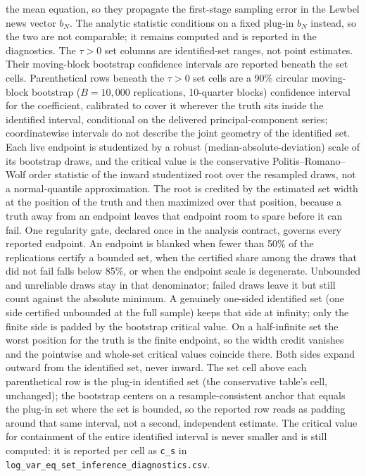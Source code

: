 \begin{table}[!htbp]
\begin{threeparttable}
\begin{tablenotes}[flushleft]
the mean equation, so they propagate the first-stage sampling error in the Lewbel news vector $b_N$. The analytic statistic conditions on a fixed plug-in $b_N$ instead, so the two are not comparable; it remains computed and is reported in the diagnostics. The $\tau{>}0$ set columns are identified-set ranges, not point estimates. Their moving-block bootstrap confidence intervals are reported beneath the set cells. Parenthetical rows beneath the $\tau{>}0$ set cells are a 90\% circular moving-block bootstrap ($B=10{,}000$ replications, 10-quarter blocks) confidence interval for the coefficient, calibrated to cover it wherever the truth sits inside the identified interval, conditional on the delivered principal-component series; coordinatewise intervals do not describe the joint geometry of the identified set. Each live endpoint is studentized by a robust (median-absolute-deviation) scale of its bootstrap draws, and the critical value is the conservative Politis--Romano--Wolf order statistic of the inward studentized root over the resampled draws, not a normal-quantile approximation. The root is credited by the estimated set width at the position of the truth and then maximized over that position, because a truth away from an endpoint leaves that endpoint room to spare before it can fail. One regularity gate, declared once in the analysis contract, governs every reported endpoint. An endpoint is blanked when fewer than 50\% of the replications certify a bounded set, when the certified share among the draws that did not fail falls below 85\%, or when the endpoint scale is degenerate. Unbounded and unreliable draws stay in that denominator; failed draws leave it but still count against the absolute minimum. A genuinely one-sided identified set (one side certified unbounded at the full sample) keeps that side at infinity; only the finite side is padded by the bootstrap critical value. On a half-infinite set the worst position for the truth is the finite endpoint, so the width credit vanishes and the pointwise and whole-set critical values coincide there. Both sides expand outward from the identified set, never inward. The set cell above each parenthetical row is the plug-in identified set (the conservative table's cell, unchanged); the bootstrap centers on a resample-consistent anchor that equals the plug-in set where the set is bounded, so the reported row reads as padding around that same interval, not a second, independent estimate. The critical value for containment of the entire identified interval is never smaller and is still computed: it is reported per cell as \texttt{c\_s} in \texttt{log\_var\_eq\_set\_inference\_diagnostics.csv}.
\end{tablenotes}
\end{threeparttable}
\end{table}
